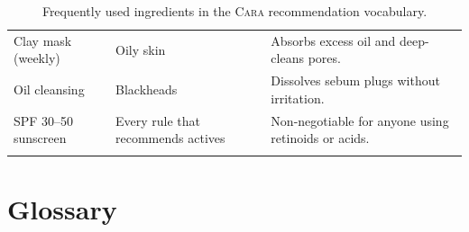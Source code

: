 \documentclass[11pt,a4paper,oneside]{report}
\newcommand{\cara}{\textsc{Cara}\xspace}
\begin{document}
\begin{longtable}{@{}p{3.9cm}p{4.3cm}p{5.7cm}@{}}
    Clay mask (weekly)        & Oily skin                                        & Absorbs excess oil and deep-cleans pores. \\
    Oil cleansing             & Blackheads                                       & Dissolves sebum plugs without irritation. \\
    SPF 30--50 sunscreen      & Every rule that recommends actives               & Non-negotiable for anyone using retinoids or acids. \\
    \bottomrule
    \caption{Frequently used ingredients in the \cara recommendation
    vocabulary.}\label{tab:ingredients}
\end{longtable}

\chapter{Glossary}
\end{document}
